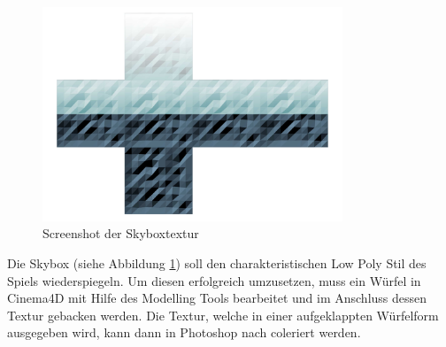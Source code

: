 
\begin{figure}[!htbp]
	\centering
		\includegraphics[width=0.8\textwidth]{images/Skybox}
	\caption{Screenshot der Skyboxtextur}
	\label{fig:Skybox}
\end{figure}

Die Skybox (siehe Abbildung \ref{fig:Skybox}) soll den charakteristischen Low Poly Stil des Spiels wiederspiegeln. Um diesen erfolgreich umzusetzen, muss ein Würfel in Cinema4D mit Hilfe des Modelling Tools bearbeitet und im Anschluss dessen Textur gebacken werden. Die Textur, welche in einer aufgeklappten Würfelform ausgegeben wird, kann dann in Photoshop nach coleriert werden.